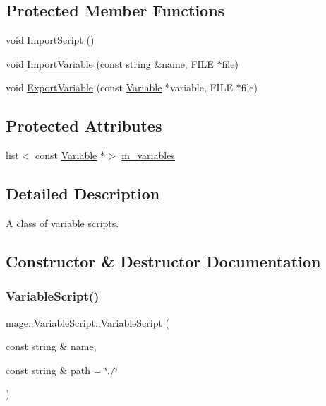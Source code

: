 \subsection*{Protected Member Functions}
\begin{DoxyCompactItemize}
\item 
void \hyperlink{classmage_1_1_variable_script_a5f1cc3bfb611edbc8dfb433ec55cc965}{Import\+Script} ()
\item 
void \hyperlink{classmage_1_1_variable_script_ae7ab24f4d3bb11579ce9cfb690ba7a4f}{Import\+Variable} (const string \&name, F\+I\+LE $\ast$file)
\item 
void \hyperlink{classmage_1_1_variable_script_a69aaa511e7e00912cee95c04cf31b4f5}{Export\+Variable} (const \hyperlink{structmage_1_1_variable}{Variable} $\ast$variable, F\+I\+LE $\ast$file)
\end{DoxyCompactItemize}
\subsection*{Protected Attributes}
\begin{DoxyCompactItemize}
\item 
list$<$ const \hyperlink{structmage_1_1_variable}{Variable} $\ast$$>$ \hyperlink{classmage_1_1_variable_script_ab40d512a3323a56c0f0e6d5dfb33d2ad}{m\+\_\+variables}
\end{DoxyCompactItemize}


\subsection{Detailed Description}
A class of variable scripts. 

\subsection{Constructor \& Destructor Documentation}
\hypertarget{classmage_1_1_variable_script_a8b40c66f4f025bbf85b60ac57eb92248}{}\label{classmage_1_1_variable_script_a8b40c66f4f025bbf85b60ac57eb92248} 
\subsubsection{\texorpdfstring{Variable\+Script()}{VariableScript()}}
{\footnotesize\ttfamily mage\+::\+Variable\+Script\+::\+Variable\+Script (\begin{DoxyParamCaption}\item[{const string \&}]{name,  }\item[{const string \&}]{path = {\ttfamily \char`\"{}./\char`\"{}} }\end{DoxyParamCaption})}


